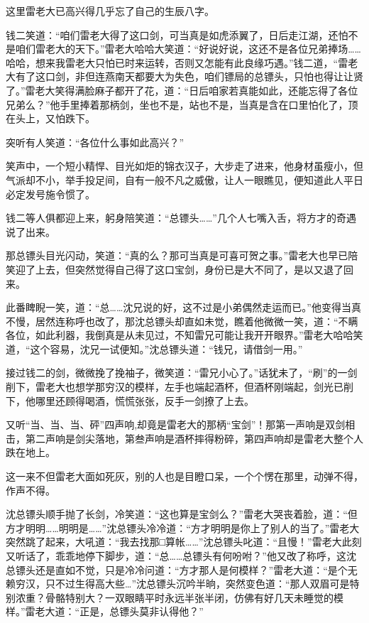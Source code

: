 \documentclass[12pt,oneside]{book}
\begin{document}
这里雷老大已高兴得几乎忘了自己的生辰八字。

钱二笑道：``咱们雷老大得了这口剑，可当真是如虎添翼了，日后走江湖，还怕不是咱们雷老大的天下。''雷老大哈哈大笑道：``好说好说，这还不是各位兄弟捧场\ldots\ldots 哈哈，想来我雷老大只怕已时来运转，否则又怎能有此良缘巧遇。''钱二道，``雷老大有了这口剑，非但连燕南天都要大为失色，咱们镖局的总镖头，只怕也得让让贤了。''雷老大笑得满脸麻子都开了花，道：``日后咱家若真能如此，还能忘得了各位兄弟么？''他手里捧着那柄剑，坐也不是，站也不是，当真是含在口里怕化了，顶在头上，又怕跌下。

突听有人笑道：``各位什么事如此高兴？''

笑声中，一个短小精悍、目光如炬的锦衣汉子，大步走了进来，他身材虽瘦小，但气派却不小，举手投足间，自有一般不凡之威傲，让人一眼瞧见，便知道此人平日必定发号施令惯了。

钱二等人俱都迎上来，躬身陪笑道：``总镖头\ldots\ldots{}''几个人七嘴入舌，将方才的奇遇说了出来。

那总镖头目光闪动，笑道：``真的么？那可当真是可喜可贺之事。''雷老大也早已陪笑迎了上去，但突然觉得自己得了这口宝剑，身份已是大不同了，是以又退了回来。

此番睥睨一笑，道：``总\ldots\ldots 沈兄说的好，这不过是小弟偶然走运而已。''他变得当真不慢，居然连称呼也改了，那沈总镖头却直如未觉，瞧着他微微一笑，道：``不瞒各位，如此利器，我倒真是从未见过，不知雷兄可能让我开开眼界。''雷老大哈哈笑道，``这个容易，沈兄一试便知。''沈总镖头道：``钱兄，请借剑一用。''

接过钱二的剑，微微挽了挽袖子，微笑道：``雷兄小心了。''话犹未了，``刷''的一剑削下，雷老大也想学那穷汉的模样，左手也端起酒杯，但酒杯刚端起，剑光已削下，他哪里还顾得喝酒，慌慌张张，反手一剑撩了上去。

又听``当、当、当、砰''四声响,却竟是雷老大的那柄``宝剑''！那第一声响是双剑相击，第二声响是剑尖落地，第叁声响是酒杯摔得粉碎，第四声响却是雷老大整个人跌在地上。

这一来不但雷老大面如死灰，别的人也是目瞪口呆，一个个愣在那里，动弹不得，作声不得。

沈总镖头顺手抛了长剑，冷笑道：``这也算是宝剑么？''雷老大哭丧着脸，道：``但方才明明\ldots\ldots 明明是\ldots\ldots{}''沈总镖头冷冷道：``方才明明是你上了别人的当了。''雷老大突然跳了起来，大吼道：``我去找那□算帐\ldots\ldots{}''沈总镖头叱道：``且慢！''雷老大此刻又听话了，乖乖地停下脚步，道：``总\ldots\ldots 总镖头有何吩咐？''他又改了称呼，这沈总镖头还是直如不觉，只是冷冷问道：``方才那人是何模样？''雷老大道：``是个无赖穷汉，只不过生得高大些\ldots{}''沈总镖头沉吟半晌，突然变色道：``那人双眉可是特别浓重？骨骼特别大？一双眼睛平时永远半张半闭，仿佛有好几天未睡觉的模样。''雷老大道：``正是，总镖头莫非认得他？''
\end{document}
